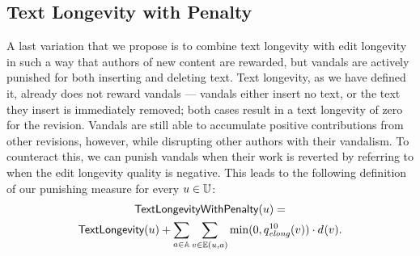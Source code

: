 \subsection{Text Longevity with Penalty}

\noindent
A last variation that we propose is to combine text longevity with
edit longevity in such a way that authors of new content are rewarded,
but vandals are actively punished for both inserting and deleting text.
Text longevity, as we have defined it, already does not
reward vandals --- vandals either insert no text, or the
text they insert is immediately removed; both cases result
in a text longevity of zero for the revision.
Vandals are still able to accumulate positive contributions
from other revisions, however, while disrupting other
authors with their vandalism.
To counteract this, we can punish vandals when their work is reverted by
referring to when the edit longevity quality is negative.
This leads to the following definition of our punishing
measure for every $u \in \mathbb{U}$:
%
\begin{gather*}
\punish(u) = \\
\textlong(u) +
\sum_{a \in \articles} \sum_{v \in \authorrevs{u, a}} \min(0, \quality{elong}{10}{v}) \cdot \dist{}{v}.
\end{gather*}
%

